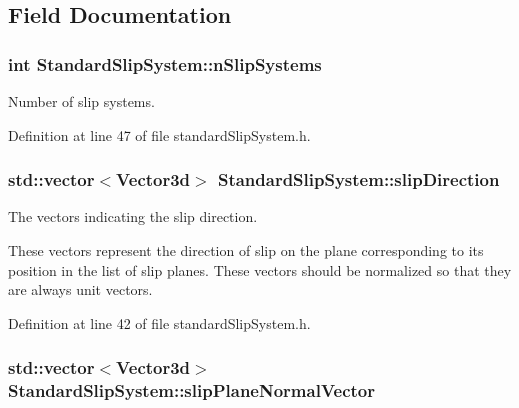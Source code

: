 \subsection{\-Field \-Documentation}
\hypertarget{classStandardSlipSystem_a893e6d9f9192061d9d3c83a9b8d0d61d}{
\subsubsection[{n\-Slip\-Systems}]{\setlength{\rightskip}{0pt plus 5cm}int {\bf \-Standard\-Slip\-System\-::n\-Slip\-Systems}}}\label{d1/dd4/classStandardSlipSystem_a893e6d9f9192061d9d3c83a9b8d0d61d}


\-Number of slip systems. 



\-Definition at line 47 of file standard\-Slip\-System.\-h.

\hypertarget{classStandardSlipSystem_af374545c3095d91935eb1a7fc5cc55c2}{
\subsubsection[{slip\-Direction}]{\setlength{\rightskip}{0pt plus 5cm}std\-::vector$<${\bf \-Vector3d}$>$ {\bf \-Standard\-Slip\-System\-::slip\-Direction}}}\label{d1/dd4/classStandardSlipSystem_af374545c3095d91935eb1a7fc5cc55c2}


\-The vectors indicating the slip direction. 

\-These vectors represent the direction of slip on the plane corresponding to its position in the list of slip planes. \-These vectors should be normalized so that they are always unit vectors. 

\-Definition at line 42 of file standard\-Slip\-System.\-h.

\hypertarget{classStandardSlipSystem_ad26f5235cfada6bec941410a2a002e6b}{
\subsubsection[{slip\-Plane\-Normal\-Vector}]{\setlength{\rightskip}{0pt plus 5cm}std\-::vector$<${\bf \-Vector3d}$>$ {\bf \-Standard\-Slip\-System\-::slip\-Plane\-Normal\-Vector}}}\label{d1/dd4/classStandardSlipSystem_ad26f5235cfada6bec941410a2a002e6b}


